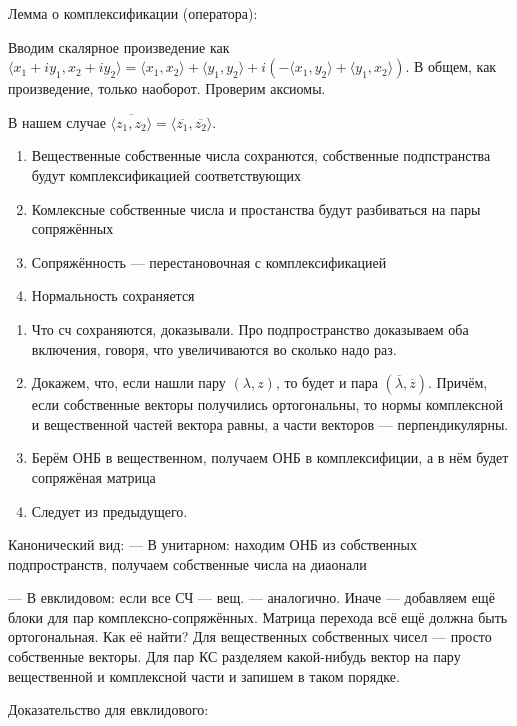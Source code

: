 \documentclass[12pt, a4paper]{article}
\begin{document}
Лемма о комплексификации (оператора):

Вводим скалярное произведение как $\langle x_1 + i y_1, x_2 + i y_2 \rangle = \langle x_1, x_2 \rangle + \langle y_1, y_2 \rangle + i \left(-\langle x_1, y_2 \rangle + \langle y_1, x_2 \rangle\right)$.
В общем, как произведение, только наоборот. Проверим аксиомы.

В нашем случае $\overline{\langle z_1, z_2 \rangle} = \langle \overline{z_1}, \overline{z_2} \rangle$.


\begin{enumerate}
    \item Вещественные собственные числа сохранются, собственные подпстранства будут комплексификацией соответствующих
    \item Комлексные собственные числа и простанства будут разбиваться на пары сопряжённых
    \item Сопряжённость — перестановочная с комплексификацией
    \item Нормальность сохраняется
\end{enumerate}

\begin{enumerate}
    \item Что сч сохраняются, доказывали. Про подпространство доказываем оба включения, говоря, что увеличиваются во сколько надо раз.
    \item Докажем, что, если нашли пару $(\lambda, z)$, то будет и пара $(\overline{\lambda}, \overline{z})$. 
    Причём, если собственные векторы получились ортогональны, то нормы комплексной и вещественной частей вектора равны, а части векторов — перпендикулярны.
    \item Берём ОНБ в вещественном, получаем ОНБ в комплексифиции, а в нём будет сопряжёная матрица
    \item Следует из предыдущего.
\end{enumerate}

Канонический вид:
— В унитарном: находим ОНБ из собственных подпространств, получаем собственные числа на диаонали

— В евклидовом: если все СЧ — вещ. — аналогично. Иначе — добавляем ещё блоки для пар комплексно-сопряжённых.
Матрица перехода всё ещё должна быть ортогональная. Как её найти? Для вещественных собственных чисел — просто собственные векторы. 
Для пар КС разделяем какой-нибудь вектор на пару вещественной и комплексной части и запишем в таком порядке.

Доказательство для евклидового:
\end{document}
